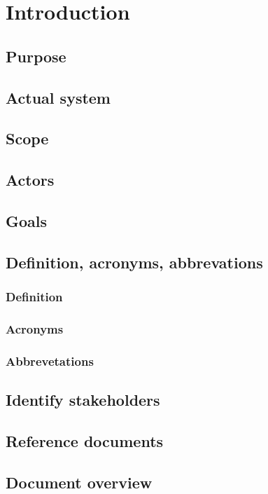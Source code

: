 \chapter{Introduction}

\section{Purpose}

\section{Actual system}

\section{Scope}

\section{Actors}

\section{Goals}

\section{Definition, acronyms, abbrevations}

\subsection{Definition}

\subsection{Acronyms}

\subsection{Abbrevetations}

\section{Identify stakeholders}

\section{Reference documents}

\section{Document overview}


